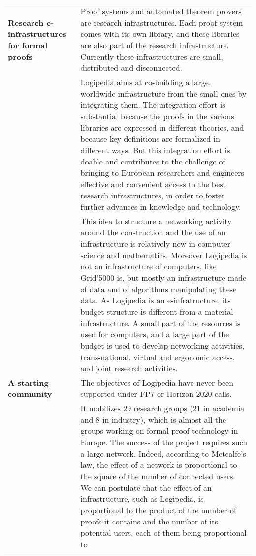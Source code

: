 \begin{longtable}{|p{}|p{}|}
\hline
{\bf Research \newline e-infrastructures for formal proofs}
&
Proof systems and automated theorem provers are research
infrastructures. Each proof system comes with its own library, and
these libraries are also part of the research infrastructure.  Currently
these infrastructures are small, distributed and disconnected.\\
&
\hspace{0.4cm}
Logipedia aims at co-building a large, worldwide infrastructure from the
small ones by integrating them.  The integration effort is substantial
because the proofs in the various libraries are expressed in different
theories, and because key definitions are formalized in different
ways.  But this integration effort is doable and contributes to the
challenge of bringing to European researchers and engineers effective and
convenient access to the best research infrastructures, in order to
foster further advances in knowledge and technology.\\
&
\hspace{0.4cm}
This idea to structure a networking activity around the construction
and the use of an infrastructure is relatively new in computer science
and mathematics. Moreover Logipedia is not an infrastructure of
computers, like Grid'5000 is, but mostly an infrastructure made of
data and of algorithms manipulating these data.  As Logipedia is an
e-infratructure, its budget structure is different from a material
infrastructure. A small part of the resources is used for computers,
and a large part of the budget is used to develop networking
activities, trans-national, virtual and ergonomic access, and joint
research activities.\\
\hline
{\bf A starting community}
&
The objectives of Logipedia have never 
been supported under FP7 or Horizon 2020 calls.\\
&
\hspace{0.4cm} It mobilizes 29 research groups (21 in
academia and 8 in industry), which is
almost all the groups working on formal proof technology in Europe.
The success of the project requires such a large network.  Indeed,
according to Metcalfe's law, the effect of a network is
proportional to the square of the number of connected users. We can
postulate that the effect of an infrastructure, such as Logipedia, is
proportional to the product of the number of proofs it contains and
the number of its potential users, each of them being proportional to

\end{longtable}
